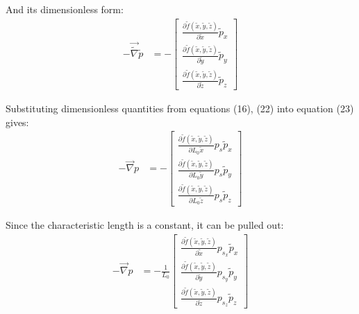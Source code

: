\documentclass[titlepage]{article}
\begin{document}
\noindent And its dimensionless form:  
\begin{align}
    -\vec{\tilde{\nabla}}\tilde{p} &= -\begin{bmatrix}
        \displaystyle\frac{\partial{\tilde{f}\left(\tilde{x},\tilde{y},\tilde{z}\right)}}{\partial{\tilde{x}}}\tilde{p}_{x} \\[0.4cm]
        \displaystyle\frac{\partial{\tilde{f}\left(\tilde{x},\tilde{y},\tilde{z}\right)}}{\partial{\tilde{y}}}\tilde{p}_{y} \\[0.4cm]
        \displaystyle\frac{\partial{\tilde{f}\left(\tilde{x},\tilde{y},\tilde{z}\right)}}{\partial{\tilde{z}}}\tilde{p}_{z} 
    \end{bmatrix}
\end{align}

\noindent Substituting dimensionless quantities from equations (16), (22) into equation (23) gives: 
\begin{align}
    -\vec{\nabla}p &= -\begin{bmatrix}
        \displaystyle\frac{\partial{\tilde{f}\left(\tilde{x},\tilde{y},\tilde{z}\right)}}{\partial{L_{0}\tilde{x}}}p_{s}\tilde{p}_{x} \\[0.4cm]
        \displaystyle\frac{\partial{\tilde{f}\left(\tilde{x},\tilde{y},\tilde{z}\right)}}{\partial{L_{0}\tilde{y}}}p_{s}\tilde{p}_{y} \\[0.4cm]
        \displaystyle\frac{\partial{\tilde{f}\left(\tilde{x},\tilde{y},\tilde{z}\right)}}{\partial{L_{0}\tilde{z}}}p_{s}\tilde{p}_{z} 
    \end{bmatrix}
\end{align}



\noindent Since the characteristic length is a constant, it can be pulled out: 
\begin{align}
    -\vec{\nabla}p &= -\displaystyle\frac{1}{L_{0}}\begin{bmatrix}
        \displaystyle\frac{\partial{\tilde{f}\left(\tilde{x},\tilde{y},\tilde{z}\right)}}{\partial{\tilde{x}}}p_{s_{x}}\tilde{p}_{x} \\[0.4cm]
        \displaystyle\frac{\partial{\tilde{f}\left(\tilde{x},\tilde{y},\tilde{z}\right)}}{\partial{\tilde{y}}}p_{s_{y}}\tilde{p}_{y} \\[0.4cm]
        \displaystyle\frac{\partial{\tilde{f}\left(\tilde{x},\tilde{y},\tilde{z}\right)}}{\partial{\tilde{z}}}p_{s_{z}}\tilde{p}_{z} 
    \end{bmatrix}
\end{align}
\end{document}
